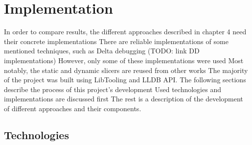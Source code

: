 \chapter{Implementation}

In order to compare results, the different approaches described in chapter 4 need their concrete implementations
There are reliable implementations of some mentioned techniques, such as Delta debugging (TODO: link DD implementations)
However, only some of these implementations were used
Most notably, the static and dynamic slicers are reused from other works
The majority of the project was built using LibTooling and LLDB API.
The following sections describe the process of this project's development
Used technologies and implementations are discussed first
The rest is a description of the development of different approaches and their components.

\section{Technologies} 

